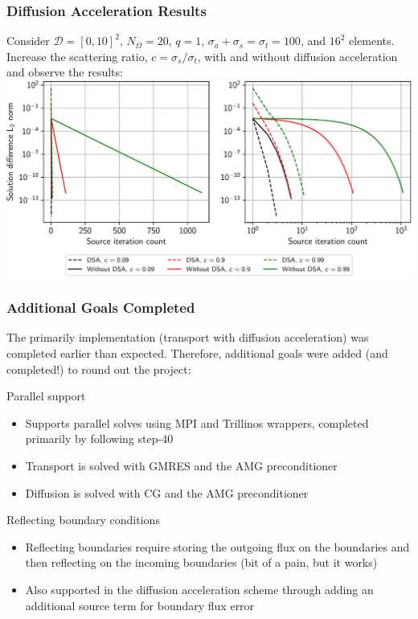 \documentclass[xcolor={usenames,dvipsnames,svgnames,table}, 10pt]{beamer}
\newcommand{\spatial}{\mathcal{D}} %
\begin{document}

\begin{frame}\frametitle{Diffusion Acceleration Results}
	Consider $\spatial = [0, 10]^2$, $N_\Omega = 20$, $q = 1$, $\sigma_a + \sigma_s = \sigma_t = 100$, and $16^2$ elements. Increase the scattering ratio, $c = \sigma_s / \sigma_t$, with and without diffusion acceleration and observe the results:
	\vfill
	\includegraphics[width=0.95\linewidth]{plots/dsa_residuals}
	\vfill
\end{frame}


\begin{frame}\frametitle{Additional Goals Completed}
	The primarily implementation (transport with diffusion acceleration) was completed earlier than expected. Therefore, additional goals were added (and completed!) to round out the project:
	\vfill
	\begin{block}{Parallel support}
		\begin{itemize}
			\item Supports parallel solves using MPI and Trillinos wrappers, completed primarily by following step-40
			\item Transport is solved with GMRES and the AMG preconditioner
			\item Diffusion is solved with CG and the AMG preconditioner
		\end{itemize}
	\end{block}
	\vfill
	\begin{block}{Reflecting boundary conditions}
		\begin{itemize}
			\item Reflecting boundaries require storing the outgoing flux on the boundaries and then reflecting on the incoming boundaries (bit of a pain, but it works)
			\item Also supported in the diffusion acceleration scheme through adding an additional source term for boundary flux error
		\end{itemize}
	\end{block}
\end{frame}
\end{document}
